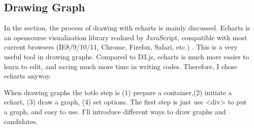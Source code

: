 \documentclass[10pt,twoside,a4paper,titlepage]{article}
\begin{document}
	\subsection{Drawing Graph}
		\par In the section, the process of drawing with echarts is mainly discussed. Echarts is an opensourse visualization library realized by JavaScript, compatible with most current browsers (IE8/9/10/11, Chrome, Firefox, Safari, etc.) . This is a very useful tool in drawing graphs. Compared to D3.js, echarts is much more easier to learn to edit, and saving much more time in writing codes. Therefore, I chose echarts anyway. 
		\par When drawing graphs the totle step is (1) prepare a container,(2) initiate a echart, (3) draw a graph, (4) set options. The first step is just use <div> to put a graph, and easy to use. I'll introduce different ways to draw graphs and candidates.
\end{document}
